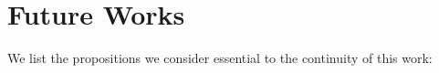 \begin{itemize}


	
		
	  	
	  	
	

	
\end{itemize}
\section{Future Works}

We list the propositions we consider essential to the continuity of this work:

